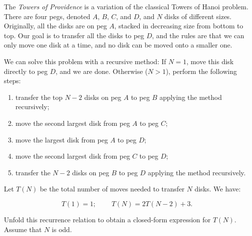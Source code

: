 The {\em Towers of Providence} is a variation of the classical Towers of
Hanoi problem.  There are four pegs, denoted $A$, $B$, $C$, and $D$,
and $N$ disks of different sizes.  Originally, all the disks are on peg
$A$, stacked in decreasing size from bottom to top. Our goal is to
transfer all the disks to peg $D$, and the rules are that we can only
move one disk at a time, and no disk can be moved onto a smaller one.

We can solve this problem with a recursive method:  If $N=1$, move this
disk directly to peg $D$, and we are done. Otherwise ($N>1$), perform
the following steps:
\begin{enumerate}
\item  transfer the top $N-2$ disks on peg $A$ to peg $B$ applying the
method recursively;
\item  move the second largest disk from peg $A$ to peg $C$;
\item  move the largest disk from peg $A$ to peg $D$;
\item  move the second largest disk from peg $C$ to peg $D$;
\item  transfer the $N-2$ disks on peg $B$ to peg $D$ applying
the method recursively.
\end{enumerate}
\medskip
Let $T(N)$ be the total number of moves needed to transfer
$N$ disks.  We have:

\[  T(1) = 1 ; ~~~~~~~~~~ T(N) = 2 T(N-2) + 3 . \]

Unfold this recurrence relation to obtain a closed-form expression for
$T(N)$.  Assume that $N$ is odd.

